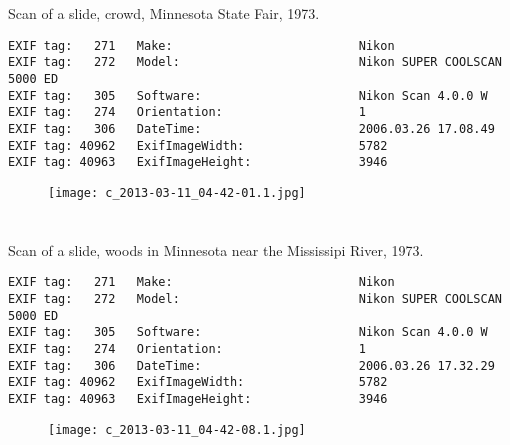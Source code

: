 \section{\protect{}}
\noindent Scan of a slide, crowd, Minnesota State Fair, 1973.
\noindent
\begin{lstlisting}
EXIF tag:   271   Make:                          Nikon
EXIF tag:   272   Model:                         Nikon SUPER COOLSCAN 5000 ED
EXIF tag:   305   Software:                      Nikon Scan 4.0.0 W
EXIF tag:   274   Orientation:                   1
EXIF tag:   306   DateTime:                      2006.03.26 17.08.49
EXIF tag: 40962   ExifImageWidth:                5782
EXIF tag: 40963   ExifImageHeight:               3946

\end{lstlisting}
\clearpage
\begin{figure}
\raggedleft
\texttt{[image: c\_2013-03-11\_04-42-01.1.jpg]}
\end{figure}


\clearpage
\section{\protect{}}
\noindent Scan of a slide, woods in Minnesota near the Mississipi River, 1973.
\noindent
\begin{lstlisting}
EXIF tag:   271   Make:                          Nikon
EXIF tag:   272   Model:                         Nikon SUPER COOLSCAN 5000 ED
EXIF tag:   305   Software:                      Nikon Scan 4.0.0 W
EXIF tag:   274   Orientation:                   1
EXIF tag:   306   DateTime:                      2006.03.26 17.32.29
EXIF tag: 40962   ExifImageWidth:                5782
EXIF tag: 40963   ExifImageHeight:               3946

\end{lstlisting}
\clearpage
\begin{figure}
\raggedleft
\texttt{[image: c\_2013-03-11\_04-42-08.1.jpg]}
\end{figure}


\clearpage
